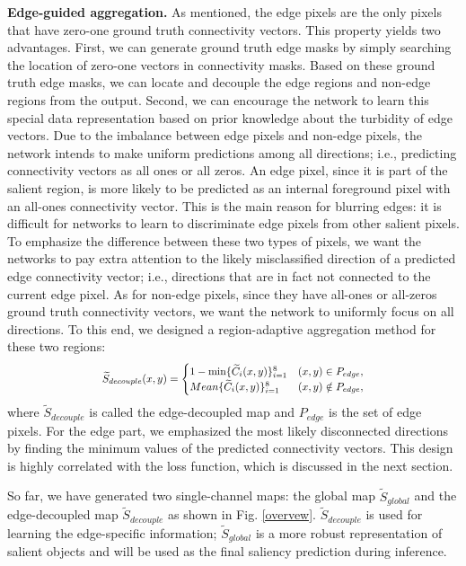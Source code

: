 \documentclass[final]{cvpr}
\newcommand*{\Scale}[2][4]{\scalebox{#1}{$#2$}}%
\begin{document}
\textbf{Edge-guided aggregation.} As mentioned, the edge pixels are the only pixels that have zero-one ground truth connectivity vectors. This property yields two advantages. First, we can generate ground truth edge masks by simply searching the location of zero-one vectors in connectivity masks. Based on these ground truth edge masks, we can locate and decouple the edge regions and non-edge regions from the output. Second, we can encourage the network to learn this special data representation based on prior knowledge about the turbidity of edge vectors. Due to the imbalance between edge pixels and non-edge pixels, the network intends to make uniform predictions among all directions; i.e., predicting connectivity vectors as all ones or all zeros. An edge pixel, since it is part of the salient region, is more likely to be predicted as an internal foreground pixel with an all-ones connectivity vector. This is the main reason for blurring edges: it is difficult for networks to learn to discriminate edge pixels from other salient pixels. To emphasize the difference between these two types of pixels, we want the networks to pay extra attention to the likely misclassified direction of a predicted edge connectivity vector; i.e., directions that are in fact not connected to the current edge pixel. As for non-edge pixels, since they have all-ones or all-zeros ground truth connectivity vectors, we want the network to uniformly focus on all directions. To this end, we designed a region-adaptive aggregation method for these two regions:
\begin{equation}
\label{decouple}
\Scale[0.85]{
\widetilde S_{decouple}(x,y)=
\begin{cases}
{1 - \min \{ {{\widetilde C}_i}(x,y)\} _{i = 1}^8}& {(x,y) \in {P_{edge}}},\\
{Mean\{ {{\widetilde C}_i}(x,y)\} _{i = 1}^8}& {(x,y) \notin {P_{edge}}},
\end{cases}}
\end{equation}
where $\widetilde S_{decouple}$ is called the edge-decoupled map and $P_{edge}$ is the set of edge pixels. For the edge part, we emphasized the most likely disconnected directions by finding the minimum values of the predicted connectivity vectors. This design is highly correlated with the loss function, which is discussed in the next section.

So far, we have generated two single-channel maps: the global map $\widetilde S_{global}$ and the edge-decoupled map $\widetilde S_{decouple}$ as shown in Fig. \ref{overvew}. $\widetilde S_{decouple}$ is used for learning the edge-specific information; $\widetilde S_{global}$ is a more robust representation of salient objects and will be used as the final saliency prediction during inference.
\end{document}
